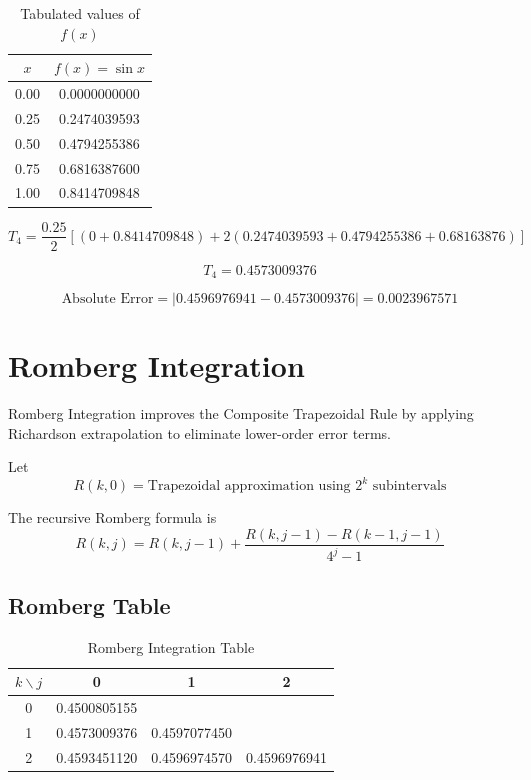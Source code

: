 \documentclass[12pt]{article}
\begin{document}
\begin{table}[H]
\centering
\begin{tabular}{c c}
\toprule
$x$ & $f(x)=\sin x$ \\
\midrule
0.00 & 0.0000000000 \\
0.25 & 0.2474039593 \\
0.50 & 0.4794255386 \\
0.75 & 0.6816387600 \\
1.00 & 0.8414709848 \\
\bottomrule
\end{tabular}
\caption{Tabulated values of $f(x)$}
\end{table}

\[
T_4 = \frac{0.25}{2}
\left[(0 + 0.8414709848) + 2(0.2474039593 + 0.4794255386 + 0.68163876)\right]
\]

\[
T_4 = 0.4573009376
\]

\[
\text{Absolute Error} = |0.4596976941 - 0.4573009376| = 0.0023967571
\]

\section{Romberg Integration}

Romberg Integration improves the Composite Trapezoidal Rule by applying Richardson
extrapolation to eliminate lower-order error terms.

Let
\[
R(k,0) = \text{Trapezoidal approximation using } 2^k \text{ subintervals}
\]

The recursive Romberg formula is
\[
R(k,j) = R(k,j-1) +
\frac{R(k,j-1) - R(k-1,j-1)}{4^j - 1}
\]

\subsection*{Romberg Table}

\begin{table}[H]
\centering
\begin{tabular}{c c c c}
\toprule
$k \backslash j$ & 0 & 1 & 2 \\
\midrule
0 & 0.4500805155 & & \\
1 & 0.4573009376 & 0.4597077450 & \\
2 & 0.4593451120 & 0.4596974570 & 0.4596976941 \\
\bottomrule
\end{tabular}
\caption{Romberg Integration Table}
\end{table}
\end{document}
